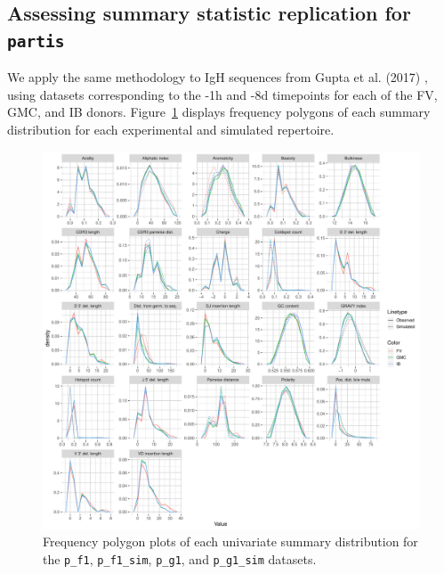 \documentclass{article}
\newcommand{\partis}{\texttt{partis}}
\begin{document}
\subsection*{Assessing summary statistic replication for \partis}
We apply the same methodology to IgH sequences from Gupta et al. (2017) \cite{Gupta2017-ve}, using datasets corresponding to the -1h and -8d timepoints for each of the FV, GMC, and IB donors.
Figure~\ref{fig:PartisFreqPolys} displays frequency polygons of each summary distribution for each experimental and simulated repertoire.
\begin{figure}
    \includegraphics[width=\linewidth]{Figures/PartisScores/partis_freqpoly.pdf}
    \caption{Frequency polygon plots of each univariate summary distribution for the \texttt{p\_f1}, \texttt{p\_f1\_sim}, \texttt{p\_g1}, and \texttt{p\_g1\_sim} datasets.}
    \label{fig:PartisFreqPolys}
\end{figure}
\end{document}
